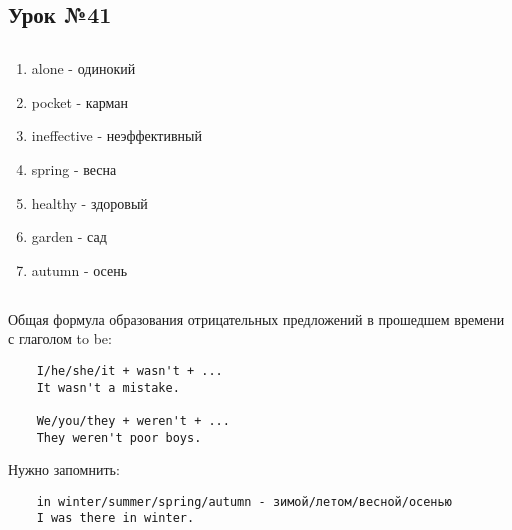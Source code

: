 \subsection{Урок №41}

\subsection*{}
\begin{multicols}{2}
    \begin{enumerate}\setlength{\itemsep}{0pt}
        \item alone - одинокий
        \item pocket - карман
        \item ineffective - неэффективный
        \item spring - весна
        \item healthy - здоровый
        \item garden - сад
        \item autumn - осень
    \end{enumerate}
\end{multicols}

\subsection*{}
Общая формула образования отрицательных предложений в прошедшем времени с глаголом to be:
\begin{verbatim}
    I/he/she/it + wasn't + ...
    It wasn't a mistake.

    We/you/they + weren't + ...
    They weren't poor boys.
\end{verbatim}

Нужно запомнить:
\begin{verbatim}
    in winter/summer/spring/autumn - зимой/летом/весной/осенью
    I was there in winter.
\end{verbatim}
